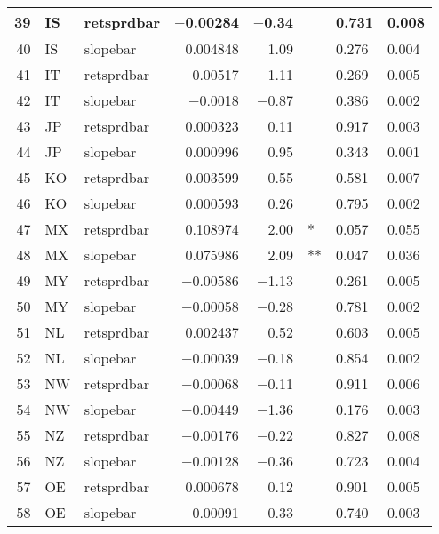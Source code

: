 \begin{longtable}{|r|l|l|r|r|l|l|l|}
   39 &    IS &    retsprdbar &    $-$0.00284 &    $-$0.34 &      &    0.731 &    0.008\\\hline
   40 &    IS &    slopebar &    0.004848 &    1.09 &      &    0.276 &    0.004\\\hline
   41 &    IT &    retsprdbar &    $-$0.00517 &    $-$1.11 &      &    0.269 &    0.005\\\hline
   42 &    IT &    slopebar &    $-$0.0018 &    $-$0.87 &      &    0.386 &    0.002\\\hline
   43 &    JP &    retsprdbar &    0.000323 &    0.11 &      &    0.917 &    0.003\\\hline
   44 &    JP &    slopebar &    0.000996 &    0.95 &      &    0.343 &    0.001\\\hline
   45 &    KO &    retsprdbar &    0.003599 &    0.55 &      &    0.581 &    0.007\\\hline
   46 &    KO &    slopebar &    0.000593 &    0.26 &      &    0.795 &    0.002\\\hline
   47 &    MX &    retsprdbar &    0.108974 &    2.00 &    * &    0.057 &    0.055\\\hline
   48 &    MX &    slopebar &    0.075986 &    2.09 &    ** &    0.047 &    0.036\\\hline
   49 &    MY &    retsprdbar &    $-$0.00586 &    $-$1.13 &      &    0.261 &    0.005\\\hline
   50 &    MY &    slopebar &    $-$0.00058 &    $-$0.28 &      &    0.781 &    0.002\\\hline
   51 &    NL &    retsprdbar &    0.002437 &    0.52 &      &    0.603 &    0.005\\\hline
   52 &    NL &    slopebar &    $-$0.00039 &    $-$0.18 &      &    0.854 &    0.002\\\hline
   53 &    NW &    retsprdbar &    $-$0.00068 &    $-$0.11 &      &    0.911 &    0.006\\\hline
   54 &    NW &    slopebar &    $-$0.00449 &    $-$1.36 &      &    0.176 &    0.003\\\hline
   55 &    NZ &    retsprdbar &    $-$0.00176 &    $-$0.22 &      &    0.827 &    0.008\\\hline
   56 &    NZ &    slopebar &    $-$0.00128 &    $-$0.36 &      &    0.723 &    0.004\\\hline
   57 &    OE &    retsprdbar &    0.000678 &    0.12 &      &    0.901 &    0.005\\\hline
   58 &    OE &    slopebar &    $-$0.00091 &    $-$0.33 &      &    0.740 &    0.003\\\hline

\end{longtable}
